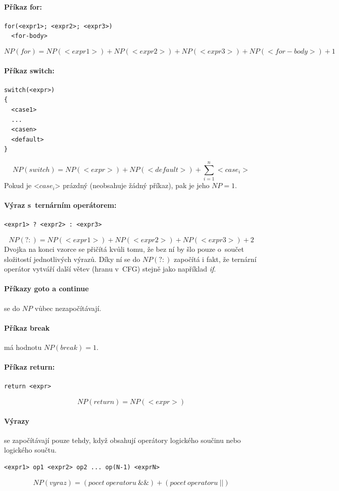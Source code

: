 \documentclass[11pt,twoside,a4paper]{book}
\begin{document}
\paragraph{Příkaz for:}
\begin{verbatim}
for(<expr1>; <expr2>; <expr3>)
  <for-body>
\end{verbatim}
$$NP(for) = NP(<expr1>) + NP(<expr2>) + NP(<expr3>) + NP(<for-body>) + 1$$

\paragraph{Příkaz switch:}
\begin{verbatim}
switch(<expr>)
{
  <case1>
  ...
  <casen>
  <default>
}
\end{verbatim}
$$NP(switch) = NP(<expr>) + NP(<default>) + \sum_{i=1}^{n}{<case_i>}$$
Pokud je <$case_i$> prázdný (neobsahuje žádný příkaz), pak je jeho $NP = 1$.

\paragraph{Výraz s~ternárním operátorem:}
\begin{verbatim}
<expr1> ? <expr2> : <expr3>
\end{verbatim}
$$NP(?:) = NP(<expr1>) + NP(<expr2>) + NP(<expr3>) + 2$$
Dvojka na konci vzorce se přičítá kvůli tomu, že bez ní by šlo pouze o~součet složitostí jednotlivých výrazů. Díky ní se do $NP(?:)$ započítá
i fakt, že ternární operátor vytváří další větev (hranu v~CFG) stejně jako například \textit{if}.

\paragraph{Příkazy goto a continue} se do $NP$ vůbec nezapočítávají.

\paragraph{Příkaz break} má hodnotu $NP(break) = 1$.

\paragraph{Příkaz return:}
\begin{verbatim}
return <expr>
\end{verbatim}
$$NP(return) = NP(<expr>)$$

\paragraph{Výrazy} se započítávají pouze tehdy, když obsahují operátory logického součinu nebo logického součtu.
\begin{verbatim}
<expr1> op1 <expr2> op2 ... op(N-1) <exprN>
\end{verbatim}
$$NP(vyraz) = ({pocet\ operatoru\ \&\&}) + ({pocet\ operatoru\ ||})$$
\end{document}
